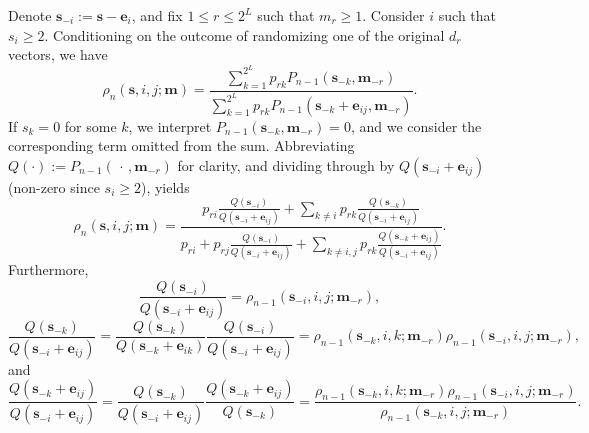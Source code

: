 \documentclass[11pt,draft]{article}
\newcommand{\sv}{\mathbf{s}}
\newcommand{\mv}{\mathbf{m}}
\newcommand{\ev}{\mathbf{e}}
\begin{document}
Denote $\sv_{-i} := \sv - \ev_i$, and fix $1 \leq r \leq 2^L$ such that
$m_r \geq 1$.
Consider $i$ such that $s_i \geq 2$.
Conditioning on the outcome of randomizing one of the original $d_r$ vectors,
we have
\begin{equation*}
\rho_n(\sv, i, j; \mv) = \frac{
\displaystyle\sum_{k = 1}^{2^L} p_{rk} P_{n-1}(\sv_{-k}, \mv_{-r})}{
\displaystyle\sum_{k = 1}^{2^L} p_{rk} P_{n-1}(\sv_{-k} + \ev_{ij}, \mv_{-r})}.
\end{equation*}
If $s_k = 0$ for some $k$, we interpret $P_{n-1}(\sv_{-k}, \mv_{-r}) = 0$, and
we consider the corresponding term omitted from the sum.
Abbreviating $Q(\cdot) := P_{n-1}(\,\cdot\,, \mv_{-r})$ for clarity, and
dividing through by $Q(\sv_{-i} + \ev_{ij})$ (non-zero since $s_i \geq 2$),
yields
\begin{equation} \label{eq:gprobratiodecomp}
\rho_n(\sv, i, j; \mv) = \frac{
p_{ri}\displaystyle \frac{Q(\sv_{-i})}{Q(\sv_{-i} + \ev_{ij})} +
\displaystyle\sum_{k\neq i} p_{rk} \frac{Q(\sv_{-k})}{Q(\sv_{-i} + \ev_{ij})} }{
p_{ri} + p_{rj} \displaystyle\frac{Q(\sv_{-i})}{Q(\sv_{-i} + \ev_{ij})} +
\displaystyle\sum_{k\neq i, j} p_{rk}
\frac{Q(\sv_{-k} + \ev_{ij})}{Q(\sv_{-i} + \ev_{ij})} }.
\end{equation}
Furthermore,
\[ \frac{Q(\sv_{-i})}{Q(\sv_{-i} + \ev_{ij})} =
\rho_{n-1}(\sv_{-i}, i, j; \mv_{-r}), \]
\begin{equation*}
\frac{Q(\sv_{-k})}{Q(\sv_{-i} + \ev_{ij})} =
\frac{Q(\sv_{-k})}{Q(\sv_{-k} + \ev_{ik})}
\frac{Q(\sv_{-i})}{Q(\sv_{-i} + \ev_{ij})}
= \rho_{n-1}(\sv_{-k}, i, k; \mv_{-r})
\rho_{n-1}(\sv_{-i}, i, j; \mv_{-r}),
\end{equation*}
and
\begin{equation*}
\frac{Q(\sv_{-k} + \ev_{ij})}{Q(\sv_{-i} + \ev_{ij})} =
\frac{Q(\sv_{-k})}{Q(\sv_{-i} + \ev_{ij})}
\frac{Q(\sv_{-k}  + \ev_{ij})}{Q(\sv_{-k})} =
\frac{\rho_{n-1}(\sv_{-k}, i, k; \mv_{-r})
\rho_{n-1}(\sv_{-i}, i, j; \mv_{-r})}{\rho_{n-1}(\sv_{-k}, i, j; \mv_{-r})}.
\end{equation*}
\end{document}
